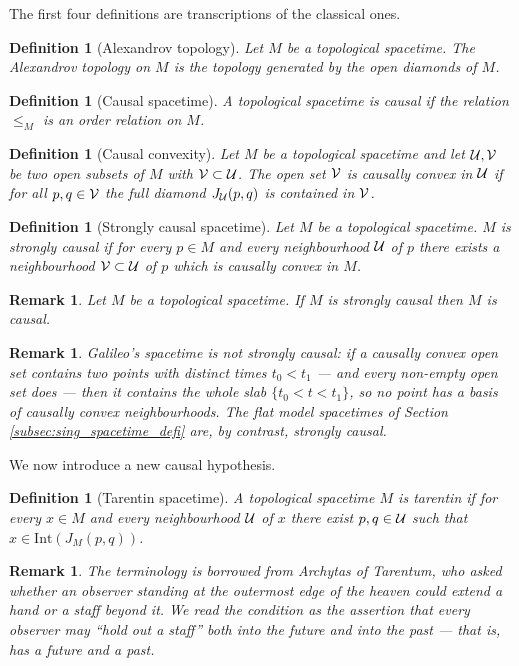 \documentclass[a4paper,twoside]{article}
\newtheorem{defi}[lem]{Definition}
\newtheorem{rem}[lem]{Remark}
\begin{document}
The first four definitions are transcriptions of the classical ones.

\begin{defi}[Alexandrov topology] Let $M$ be a topological spacetime.
The Alexandrov topology on $M$ is the topology generated by the open diamonds of $M$.
\end{defi}

\begin{defi}[Causal spacetime]
A topological spacetime is causal if the relation $\leq_M$ is an order relation on $M$.
\end{defi}

\begin{defi}[Causal convexity]\label{defi:convexite_causale}Let $M$ be a topological spacetime and let $\mathcal{U},\mathcal V$ be two open subsets of $M$ with $\mathcal V\subset\mathcal{U}$.
The open set $\mathcal V$ is {\it causally convex in $\mathcal{U}$} if for all $p,q\in \mathcal V$
the full diamond $J_{\mathcal{U}}(p,q)$ is contained in $\mathcal V$.
\end{defi}

\begin{defi}[Strongly causal spacetime]
Let $M$ be a topological spacetime. $M$ is strongly causal if
for every $p\in M$ and every neighbourhood $\mathcal{U}$ of $p$ there exists a neighbourhood $\mathcal V\subset \mathcal{U}$ of $p$
which is causally convex in $M$.
\end{defi}
\begin{rem} Let $M$ be a topological spacetime. If $M$ is strongly causal then $M$ is causal.
\end{rem}

\begin{rem} Galileo's spacetime is not strongly causal: if a causally convex open set contains two
points with distinct times $t_0<t_1$ --- and every non-empty open set does --- then it contains the
whole slab $\{t_0<t<t_1\}$, so no point has a basis of causally convex neighbourhoods. The flat
model spacetimes of Section \ref{subsec:sing_spacetime_defi} are, by contrast, strongly causal.
\end{rem}

We now introduce a new causal hypothesis.
\begin{defi}[Tarentin spacetime]
A topological spacetime $M$ is tarentin if for every $x\in M$ and every neighbourhood $\mathcal{U}$ of $x$
there exist $p,q\in \mathcal{U}$ such that $x\in \mathrm{Int}\left(J_M(p,q)\right)$.
\end{defi}
\begin{rem}
The terminology is borrowed from Archytas of Tarentum, who asked whether an observer standing at
the outermost edge of the heaven could extend a hand or a staff beyond it. We read the condition
as the assertion that every observer may ``hold out a staff'' both into the future and into the
past --- that is, has a future and a past.
\end{rem}
\end{document}
